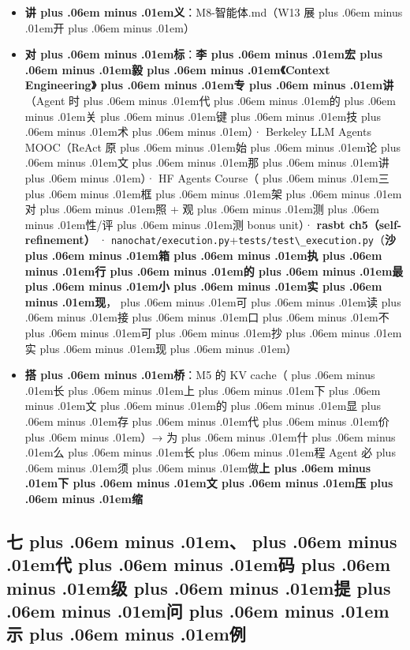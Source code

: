 \documentclass[
]{article}
\newcommand{\passthrough}[1]{#1}
\providecommand{\tightlist}{%
  \setlength{\itemsep}{0pt}\setlength{\parskip}{0pt}}
\def\zh#1{{\zhfont #1}}
\def\sym#1{{\symfont #1}}
\def\codezh#1{{\zhmonofont #1}}
\def\zhglue{\hskip0pt plus .06em minus .01em}
\begin{document}
\begin{itemize}
\tightlist
\item
  \textbf{\zh{讲\zhglue 义}}\zh{：}\passthrough{\codezh{M8-{\zh{智}}{\zh{能}}{\zh{体}}.md}}\zh{（}W13 \zh{展\zhglue 开\zhglue ）}
\item
  \textbf{\zh{对\zhglue 标}}\zh{：}\textbf{\zh{李\zhglue 宏\zhglue 毅\zhglue 《}Context Engineering\zh{》\zhglue 专\zhglue 讲}}\zh{（}Agent \zh{时\zhglue 代\zhglue 的\zhglue 关\zhglue 键\zhglue 技\zhglue 术\zhglue ）}\sym{·} Berkeley LLM Agents MOOC\zh{（}ReAct \zh{原\zhglue 始\zhglue 论\zhglue 文\zhglue 那\zhglue 讲\zhglue ）}\sym{·} HF Agents Course\zh{（\zhglue 三\zhglue 框\zhglue 架\zhglue 对\zhglue 照} + \zh{观\zhglue 测\zhglue 性}/\zh{评\zhglue 测} bonus unit\zh{）}\sym{·} \textbf{rasbt ch5\zh{（}self-refinement\zh{）}} \sym{·} \passthrough{\lstinline!nanochat/execution.py!}+\passthrough{\lstinline!tests/test\_execution.py!}\zh{（}\textbf{\zh{沙\zhglue 箱\zhglue 执\zhglue 行\zhglue 的\zhglue 最\zhglue 小\zhglue 实\zhglue 现}}\zh{，\zhglue 可\zhglue 读\zhglue 接\zhglue 口\zhglue 不\zhglue 可\zhglue 抄\zhglue 实\zhglue 现\zhglue ）}
\item
  \textbf{\zh{搭\zhglue 桥}}\zh{：}M5 \zh{的} KV cache\zh{（\zhglue 长\zhglue 上\zhglue 下\zhglue 文\zhglue 的\zhglue 显\zhglue 存\zhglue 代\zhglue 价\zhglue ）}\sym{→} \zh{为\zhglue 什\zhglue 么\zhglue 长\zhglue 程} Agent \zh{必\zhglue 须\zhglue 做}\textbf{\zh{上\zhglue 下\zhglue 文\zhglue 压\zhglue 缩}}
\end{itemize}

\subsection{\zh{七\zhglue 、\zhglue 代\zhglue 码\zhglue 级\zhglue 提\zhglue 问\zhglue 示\zhglue 例}}\label{ux4e03ux4ee3ux7801ux7ea7ux63d0ux95eeux793aux4f8b}
\end{document}
